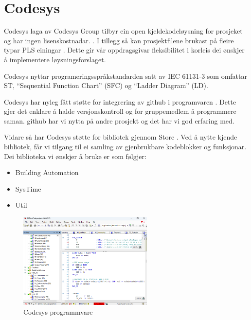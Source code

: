 \section{Codesys}
\thispagestyle{fancy}
\gls{Codesys} \citep{Codesys} laga av \gls{Codesys} Group tilbyr ein open kjeldekodeløysning for prosjeket og har ingen lisenskostnadar. \citep{CodesysLisens}. 
I tillegg så kan prosjektfilene brukast på fleire typar PLS einingar \citep{CodesysPLS}. 
Dette gir vår oppdragsgivar fleksibilitet i korleis dei ønskjer å implementere løysningsforslaget.

\gls{Codesys} nyttar programeringsspråkstandarden satt av \gls{IEC} 61131-3 som omfattar \gls{ST}, ``Sequential Function Chart'' (\gls{SFC}) og ``Ladder Diagram'' (\gls{LD}). 

\gls{Codesys} har nyleg fått støtte for integrering av \gls{github} i programvaren \citep{CodesysGIT}. 
Dette gjer det enklare å halde versjonskontroll og for gruppemedlem å programmere saman. 
\gls{github} har vi nytta på andre prosjekt og det har vi god erfaring med.

Vidare så har \gls{Codesys} støtte for bibliotek gjennom  Store \citep{CodesysStore}. 
Ved å nytte kjende bibliotek, får vi tilgang til ei samling av gjenbrukbare kodeblokker og funksjonar.
Dei biblioteka vi ønskjer å bruke er som følgjer: 

 
\begin{itemize}
    \item {} Building Automation \citep{BuildingAutomation}
    \item SysTime \citep{DateAndTime}
    \item Util \citep{Util} \newline \newline
\end{itemize} 

\begin{figure}[htbp]
    \centering
    \includegraphics[width=0.6\textwidth]{Bilder/Codesys.png}
    \caption{Codesys programmvare}\label{fig:Codesys}
\end{figure}

\newpage

